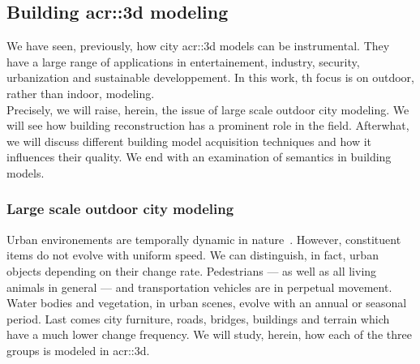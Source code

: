     \subsection{Building \gls*{acr::3d} modeling}
        \label{subsec::introduction::urban_3d_reconstruction::building_3d_modeling}
        We have seen, previously, how city \gls{acr::3d} models can be instrumental.
        They have a large range of applications in entertainement, industry, security, urbanization and sustainable developpement.
        In this work, th focus is on outdoor, rather than indoor, modeling.\\
        Precisely, we will raise, herein, the issue of large scale outdoor city modeling.
        We will see how building reconstruction has a prominent role in the field.
        Afterwhat, we will discuss different building model acquisition techniques and how it influences their quality.
        We end with an examination of semantics in building models.

        \subsubsection{Large scale outdoor city modeling}
            Urban environements are temporally dynamic in nature~\parencite{Vanhoey:2017:VVS:3084363.3085085}.
            However, constituent items do not evolve with uniform speed.
            We can distinguish, in fact, urban objects depending on their change rate.
            Pedestrians --- as well as all living animals in general --- and transportation vehicles are in perpetual movement.
            Water bodies and vegetation, in urban scenes, evolve with an annual or seasonal period.
            Last comes city furniture, roads, bridges, buildings and terrain which have a much lower change frequency.
            We will study, herein, how each of the three groups is modeled in \gls{acr::3d}.\\

